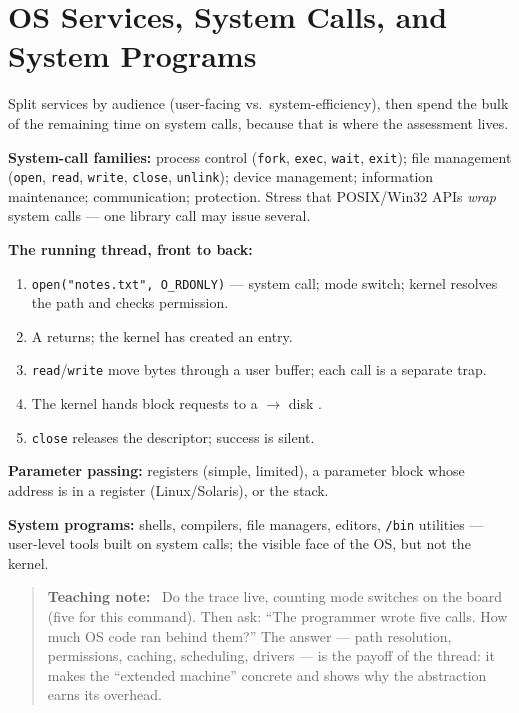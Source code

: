 \documentclass[11pt]{article}
\newenvironment{teachingaside}{\begin{quote}\small\color{primary-gold}\textbf{Teaching note:}\ }{\end{quote}}
\begin{document}
\section{OS Services, System Calls, and System Programs}

Split services by audience (user-facing vs.\ system-efficiency), then spend the bulk of the remaining time on system calls, because that is where the assessment lives.

\textbf{System-call families:} process control (\texttt{fork}, \texttt{exec}, \texttt{wait}, \texttt{exit}); file management (\texttt{open}, \texttt{read}, \texttt{write}, \texttt{close}, \texttt{unlink}); device management; information maintenance; communication; protection. Stress that POSIX/Win32 APIs \emph{wrap} system calls --- one library call may issue several.

\textbf{The running thread, front to back:}
\begin{enumerate}
  \item \texttt{open("notes.txt", O\_RDONLY)} --- system call; mode switch; kernel resolves the path and checks permission.
  \item A  returns; the kernel has created an  entry.
  \item \texttt{read}/\texttt{write} move bytes through a user buffer; each call is a separate trap.
  \item The kernel hands block requests to a  $\to$ disk .
  \item \texttt{close} releases the descriptor; success is silent.
\end{enumerate}

\textbf{Parameter passing:} registers (simple, limited), a parameter block whose address is in a register (Linux/Solaris), or the stack.

\textbf{System programs:} shells, compilers, file managers, editors, \texttt{/bin} utilities --- user-level tools built on system calls; the visible face of the OS, but not the kernel.

\begin{teachingaside}
Do the trace live, counting mode switches on the board (five for this command). Then ask: ``The programmer wrote five calls. How much OS code ran behind them?'' The answer --- path resolution, permissions, caching, scheduling, drivers --- is the payoff of the thread: it makes the ``extended machine'' concrete and shows why the abstraction earns its overhead.
\end{teachingaside}
\end{document}
